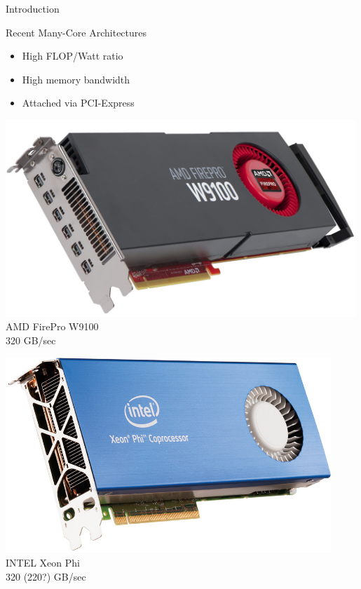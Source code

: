 

\begin{frame}{Introduction}
  \begin{block}{Recent Many-Core Architectures}
    \begin{itemize}
     \item High FLOP/Watt ratio
     \item High memory bandwidth
     \item Attached via PCI-Express
    \end{itemize}
\vspace*{1cm}
  \end{block}

   \begin{minipage}{0.3\textwidth}
    \begin{center}
     \includegraphics[width=0.99\textwidth]{figures/w9100.jpg} \\ AMD FirePro W9100 \\ 320 GB/sec
    \end{center}
   \end{minipage}
   \hspace{0.2cm}
%
   \begin{minipage}{0.3\textwidth}
    \begin{center}
     \includegraphics[width=0.92\textwidth]{figures/xeon-phi.jpg} \\ INTEL Xeon Phi \\ 320 (220?) GB/sec

\end{center}
\end{minipage}
\end{frame}
